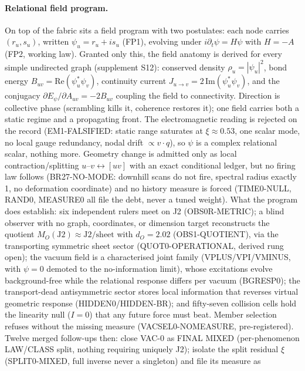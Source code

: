 \documentclass[11pt]{article}
\begin{document}
\paragraph{Relational field program.}
On top of the fabric sits a field program with two postulates: each node
carries $(r_u, s_u)$, written $\psi_u = r_u + i s_u$ (FP1), evolving under
$i\partial_t\psi = H\psi$ with $H = -A$ (FP2, working law). Granted only
this, the field anatomy is derived for every simple undirected graph
(supplement S12): conserved density $\rho_u = |\psi_u|^2$, bond energy
$B_{uv} = \mathrm{Re}(\psi^*_u\psi_v)$, continuity current
$J_{u\to v} = 2\,\mathrm{Im}(\psi^*_u\psi_v)$, and the conjugacy
$\partial E_\psi/\partial A_{uv} = -2B_{uv}$ coupling the field to
connectivity. Direction is collective phase (scrambling kills it,
coherence restores it); one field carries both a static regime and a
propagating front. The electromagnetic reading is rejected on the record
(EM1-FALSIFIED: static range saturates at $\xi \approx 0.53$, one scalar
mode, no local gauge redundancy, nodal drift $\propto v\cdot q$), so
$\psi$ is a complex relational scalar, nothing more. Geometry change is
admitted only as local contraction/splitting $u$--$v \leftrightarrow [uv]$
with an exact conditional ledger, but no firing law follows (BR27-NO-MODE:
downhill scans do not fire, spectral radius exactly 1, no deformation
coordinate) and no history measure is forced (TIME0-NULL, RAND0, MEASURE0
all file the debt, never a tuned weight). What the program does establish:
six independent rulers meet on J2 (OBS0R-METRIC); a blind observer with no
graph, coordinates, or dimension target reconstructs the quotient
$M_O(\mathrm{J2}) \approx \mathrm{J2}/\mathrm{sheet}$ with $d_O = 2.02$
(OBS1-QUOTIENT), via the transporting symmetric sheet sector
(QUOT0-OPERATIONAL, derived rung open); the vacuum field is a characterised
joint family (VPLUS/VPI/VMINUS, with $\psi = 0$ demoted to the
no-information limit), whose excitations evolve background-free while the
relational response differs per vacuum (BGRESP0); the transport-dead
antisymmetric sector stores local information that reverses virtual
geometric response (HIDDEN0/HIDDEN-BR); and fifty-seven collision cells
hold the linearity null ($I = 0$) that any future force must beat.
Member selection refuses without the missing measure (VACSEL0-NOMEASURE,
pre-registered).
Twelve merged follow-ups then: close VAC-0 as FINAL MIXED (per-phenomenon
LAW/CLASS split, nothing requiring uniquely J2); isolate the split residual
$\xi$ (SPLIT0-MIXED, full inverse never a singleton) and file its measure as
\end{document}
